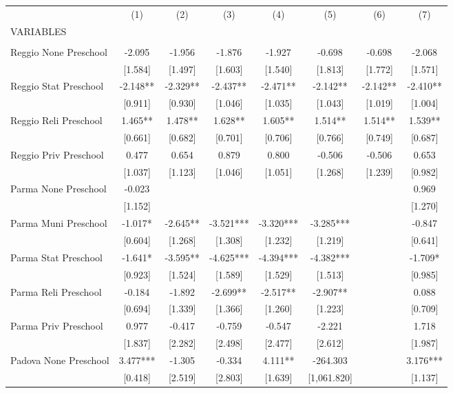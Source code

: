 \begin{tabular}{lccccccc} \hline
 & (1) & (2) & (3) & (4) & (5) & (6) & (7) \\
VARIABLES &  &  &  &  &  &  &  \\ \hline
 &  &  &  &  &  &  &  \\
Reggio None Preschool & -2.095 & -1.956 & -1.876 & -1.927 & -0.698 & -0.698 & -2.068 \\
 & [1.584] & [1.497] & [1.603] & [1.540] & [1.813] & [1.772] & [1.571] \\
Reggio Stat Preschool & -2.148** & -2.329** & -2.437** & -2.471** & -2.142** & -2.142** & -2.410** \\
 & [0.911] & [0.930] & [1.046] & [1.035] & [1.043] & [1.019] & [1.004] \\
Reggio Reli Preschool & 1.465** & 1.478** & 1.628** & 1.605** & 1.514** & 1.514** & 1.539** \\
 & [0.661] & [0.682] & [0.701] & [0.706] & [0.766] & [0.749] & [0.687] \\
Reggio Priv Preschool & 0.477 & 0.654 & 0.879 & 0.800 & -0.506 & -0.506 & 0.653 \\
 & [1.037] & [1.123] & [1.046] & [1.051] & [1.268] & [1.239] & [0.982] \\
Parma None Preschool & -0.023 &  &  &  &  &  & 0.969 \\
 & [1.152] &  &  &  &  &  & [1.270] \\
Parma Muni Preschool & -1.017* & -2.645** & -3.521*** & -3.320*** & -3.285*** &  & -0.847 \\
 & [0.604] & [1.268] & [1.308] & [1.232] & [1.219] &  & [0.641] \\
Parma Stat Preschool & -1.641* & -3.595** & -4.625*** & -4.394*** & -4.382*** &  & -1.709* \\
 & [0.923] & [1.524] & [1.589] & [1.529] & [1.513] &  & [0.985] \\
Parma Reli Preschool & -0.184 & -1.892 & -2.699** & -2.517** & -2.907** &  & 0.088 \\
 & [0.694] & [1.339] & [1.366] & [1.260] & [1.223] &  & [0.709] \\
Parma Priv Preschool & 0.977 & -0.417 & -0.759 & -0.547 & -2.221 &  & 1.718 \\
 & [1.837] & [2.282] & [2.498] & [2.477] & [2.612] &  & [1.987] \\
Padova None Preschool & 3.477*** & -1.305 & -0.334 & 4.111** & -264.303 &  & 3.176*** \\
 & [0.418] & [2.519] & [2.803] & [1.639] & [1,061.820] &  & [1.137] \\

\end{tabular}
